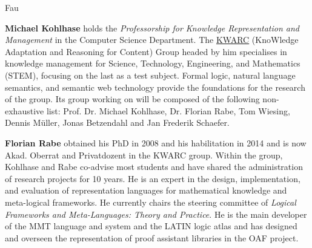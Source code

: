 \begin{sitedescription}{Fau}
\begin{compactitem}
\item\textbf{Michael Kohlhase} holds the \emph{Professorship for Knowledge Representation and Management} in the Computer Science Department.
The \href{http://kwarc.info}{KWARC} (KnoWledge Adaptation and Reasoning for Content) Group headed by him specialises in knowledge management for Science, Technology, Engineering, and Mathematics (STEM), focusing on the last as a test subject.
Formal logic, natural language semantics, and semantic web technology provide the foundations for the research of the group.
Its group working on \pn will be composed of the following non-exhaustive list: Prof. Dr. Michael Kohlhase, Dr. Florian Rabe, Tom Wiesing, Dennis M\"uller, Jonas Betzendahl and Jan Frederik Schaefer.

\item\textbf{Florian Rabe} obtained his PhD in 2008 and his habilitation in 2014 and is now Akad. Oberrat and Privatdozent in the KWARC group.
Within the group, Kohlhase and Rabe co-advise most students and have shared the administration of research projects for 10 years.
He is an expert in the design, implementation, and evaluation of representation languages for mathematical knowledge and meta-logical frameworks.
He currently chairs the steering committee of \emph{Logical Frameworks and Meta-Languages: Theory and Practice}.
He is the main developer of the MMT language and system and the LATIN logic atlas and has designed and overseen the representation of proof assistant libraries in the OAF project.
\end{compactitem}

\end{sitedescription}

